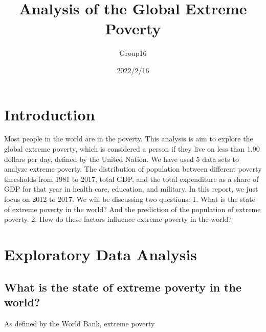 \documentclass[
]{article}
\title{Analysis of the Global Extreme Poverty}
\author{Group16}
\date{2022/2/16}
\begin{document}
\maketitle

\hypertarget{introduction}{%
\section{Introduction}\label{introduction}}

Most people in the world are in the poverty. This analysis is aim to
explore the global extreme poverty, which is considered a person if they
live on less than 1.90 dollars per day, defined by the United Nation. We
have used 5 data sets to analyze extreme poverty. The distribution of
population between different poverty thresholds from 1981 to 2017, total
GDP, and the total expenditure as a share of GDP for that year in health
care, education, and military. In this report, we just focus on 2012 to
2017. We will be discussing two questions: 1. What is the state of
extreme poverty in the world? And the prediction of the population of
extreme poverty. 2. How do these factors influence extreme poverty in
the world?

\hypertarget{exploratory-data-analysis}{%
\section{Exploratory Data Analysis}\label{exploratory-data-analysis}}

\hypertarget{what-is-the-state-of-extreme-poverty-in-the-world}{%
\subsection{What is the state of extreme poverty in the
world?}\label{what-is-the-state-of-extreme-poverty-in-the-world}}

As defined by the World Bank, extreme poverty
\end{document}
